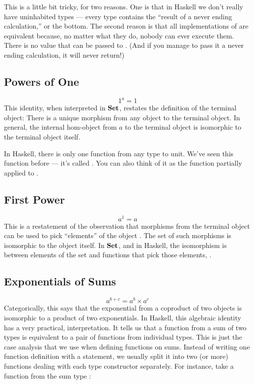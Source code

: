 This is a little bit tricky, for two reasons. One is that in Haskell we
don't really have uninhabited types --- every type contains the ``result
of a never ending calculation,'' or the bottom. The second reason is
that all implementations of  are equivalent because, no
matter what they do, nobody can ever execute them. There is no value
that can be passed to . (And if you manage to pass it a
never ending calculation, it will never return!)

\subsection{Powers of One}\label{powers-of-one}

\[1^{a} = 1\]
This identity, when interpreted in $\mathbf{Set}$, restates the definition
of the terminal object: There is a unique morphism from any object to
the terminal object. In general, the internal hom-object from $a$
to the terminal object is isomorphic to the terminal object itself.

In Haskell, there is only one function from any type  to unit.
We've seen this function before --- it's called . You can
also think of it as the function  partially applied to
\code{()}.

\subsection{First Power}\label{first-power}

\[a^{1} = a\]
This is a restatement of the observation that morphisms from the
terminal object can be used to pick ``elements'' of the object
. The set of such morphisms is isomorphic to the object
itself. In $\mathbf{Set}$, and in Haskell, the isomorphism is between
elements of the set  and functions that pick those elements,
.

\subsection{Exponentials of Sums}\label{exponentials-of-sums}

\[a^{b+c} = a^{b} \times a^{c}\]
Categorically, this says that the exponential from a coproduct of two
objects is isomorphic to a product of two exponentials. In Haskell, this
algebraic identity has a very practical, interpretation. It tells us
that a function from a sum of two types is equivalent to a pair of
functions from individual types. This is just the case analysis that we
use when defining functions on sums. Instead of writing one function
definition with a  statement, we usually split it into two
(or more) functions dealing with each type constructor separately. For
instance, take a function from the sum type
:

